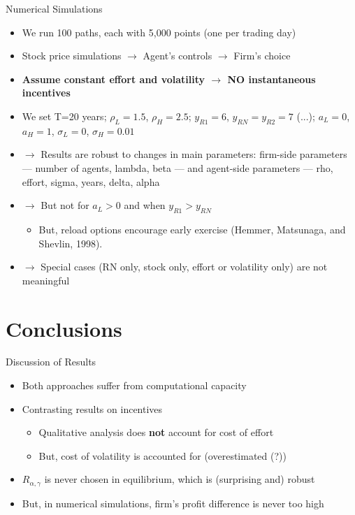 \documentclass{beamer}
\begin{document}
\begin{frame}{Numerical Simulations}
    \begin{itemize}
        \item We run 100 paths, each with 5,000 points (one per trading day)
        \item Stock price simulations $\rightarrow$ Agent's controls $\rightarrow$ Firm's choice
        \item \textbf{Assume constant effort and volatility $\rightarrow$ NO instantaneous incentives}
        \item We set T=20 years; $\rho_L = 1.5$, $\rho_H = 2.5$; $y_{R1} = 6$, $y_{RN} = y_{R2} = 7$ (...); $a_L = 0$, $a_H = 1$, $\sigma_L = 0$, $\sigma_H = 0.01$
        \item $\rightarrow$ Results are robust to changes in main parameters: firm-side parameters — number of agents, lambda, beta — and agent-side parameters — rho, effort, sigma, years, delta, alpha
        \item $\rightarrow$ But not for $a_L > 0$ and when $y_{R1} > y_{RN}$
        \begin{itemize}
            \item But, reload options encourage early exercise (Hemmer, Matsunaga, and Shevlin, 1998).
        \end{itemize}
        \item $\rightarrow$ Special cases (RN only, stock only, effort or volatility only) are not meaningful
    \end{itemize}
\end{frame}





\section{Conclusions}
\begin{frame}{Discussion of Results}
    \begin{itemize}
        \item Both approaches suffer from computational capacity
        \item Contrasting results on incentives 
        \begin{itemize}
            \item Qualitative analysis does \textbf{not} account for cost of effort
            \item But, cost of volatility is accounted for (overestimated (?))
        \end{itemize}
        \item $R_{\alpha, \gamma}$ is never chosen in equilibrium, which is (surprising and) robust
        \item But, in numerical simulations, firm's profit difference is never too high
    \end{itemize}
\end{frame}
\end{document}
